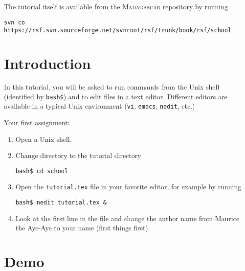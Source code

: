 The tutorial itself is available from the \textsc{Madagascar} repository
by running
\begin{verbatim}
svn co https://rsf.svn.sourceforge.net/svnroot/rsf/trunk/book/rsf/school
\end{verbatim}
\section{Introduction}

In this tutorial, you will be asked to run commands from the Unix
shell (identified by \texttt{bash\$}) and to edit files in a text
editor. Different editors are available in a typical Unix environment
(\texttt{vi}, \texttt{emacs}, \texttt{nedit}, etc.)

Your first assignment:
\begin{enumerate}
\item Open a Unix shell.
\item Change directory to the tutorial directory
\begin{verbatim}
bash$ cd school
\end{verbatim}
\item Open the \texttt{tutorial.tex} file in your favorite editor, for example by
running
\begin{verbatim}
bash$ nedit tutorial.tex & 
\end{verbatim}
\item Look at the first line in the file and change the author name from Maurice the Aye-Aye to your name (first things first). 
\end{enumerate}

\section{Demo}
